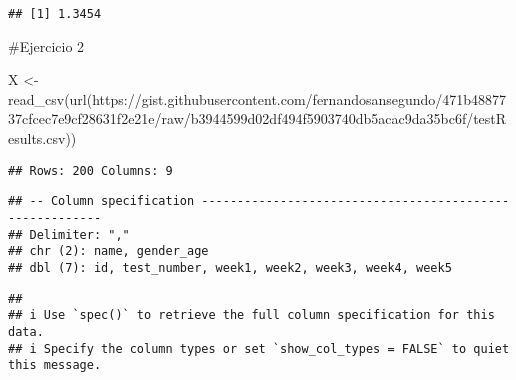 \documentclass[
]{article}
\newenvironment{Shaded}{\begin{snugshade}}{\end{snugshade}}
\newcommand{\AttributeTok}[1]{\textcolor[rgb]{0.77,0.63,0.00}{#1}}
\newcommand{\DecValTok}[1]{\textcolor[rgb]{0.00,0.00,0.81}{#1}}
\newcommand{\FunctionTok}[1]{\textcolor[rgb]{0.00,0.00,0.00}{#1}}
\newcommand{\NormalTok}[1]{#1}
\newcommand{\OtherTok}[1]{\textcolor[rgb]{0.56,0.35,0.01}{#1}}
\newcommand{\SpecialCharTok}[1]{\textcolor[rgb]{0.00,0.00,0.00}{#1}}
\newcommand{\StringTok}[1]{\textcolor[rgb]{0.31,0.60,0.02}{#1}}
\begin{document}
\begin{Shaded}
\end{Shaded}

\begin{verbatim}
## [1] 1.3454
\end{verbatim}

\#Ejercicio 2

\begin{Shaded}
\begin{Highlighting}[]
\NormalTok{X }\OtherTok{\textless{}{-}} \FunctionTok{read\_csv}\NormalTok{(}\FunctionTok{url}\NormalTok{(}\StringTok{\textquotesingle{}https://gist.githubusercontent.com/fernandosansegundo/471b4887737cfcec7e9cf28631f2e21e/raw/b3944599d02df494f5903740db5acac9da35bc6f/testResults.csv\textquotesingle{}}\NormalTok{))}
\end{Highlighting}
\end{Shaded}

\begin{verbatim}
## Rows: 200 Columns: 9
\end{verbatim}

\begin{verbatim}
## -- Column specification --------------------------------------------------------
## Delimiter: ","
## chr (2): name, gender_age
## dbl (7): id, test_number, week1, week2, week3, week4, week5
\end{verbatim}

\begin{verbatim}
## 
## i Use `spec()` to retrieve the full column specification for this data.
## i Specify the column types or set `show_col_types = FALSE` to quiet this message.
\end{verbatim}
\end{document}
